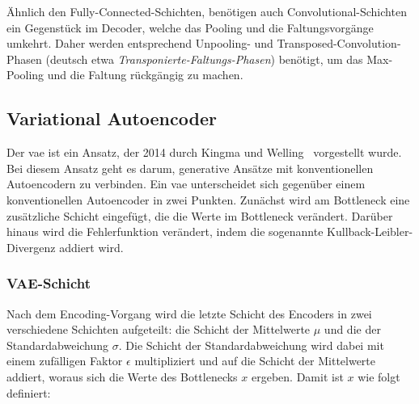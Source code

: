 Ähnlich den Fully-Connected-Schichten, benötigen auch Convolutional-Schichten ein Gegenstück im Decoder, welche das Pooling und die Faltungsvorgänge umkehrt. Daher werden entsprechend Unpooling- und Transposed-Convolution-Phasen (deutsch etwa \emph{Transponierte-Faltungs-Phasen}) benötigt, um das Max-Pooling und die Faltung rückgängig zu machen.





\subsection{Variational Autoencoder}
Der \gls{vae} ist ein Ansatz, der 2014 durch Kingma und Welling~\cite{kingmaAutoEncodingVariationalBayes2014} vorgestellt wurde. Bei diesem Ansatz geht es darum, generative Ansätze mit konventionellen Autoencodern zu verbinden. Ein \gls{vae} unterscheidet sich gegenüber einem konventionellen Autoencoder in zwei Punkten. Zunächst wird am Bottleneck eine zusätzliche Schicht eingefügt, die die Werte im Bottleneck verändert. Darüber hinaus wird die Fehlerfunktion verändert, indem die sogenannte Kullback-Leibler-Divergenz addiert wird.

\subsubsection*{VAE-Schicht}
\label{subsubsec:vae-layer}
Nach dem Encoding-Vorgang wird die letzte Schicht des Encoders in zwei verschiedene Schichten aufgeteilt: die Schicht der Mittelwerte $\mu$ und die der Standardabweichung $\sigma$. Die Schicht der Standardabweichung wird dabei mit einem zufälligen Faktor $\epsilon$ multipliziert und auf die Schicht der Mittelwerte addiert, woraus sich die Werte des Bottlenecks $x$ ergeben. Damit ist $x$ wie folgt definiert:

